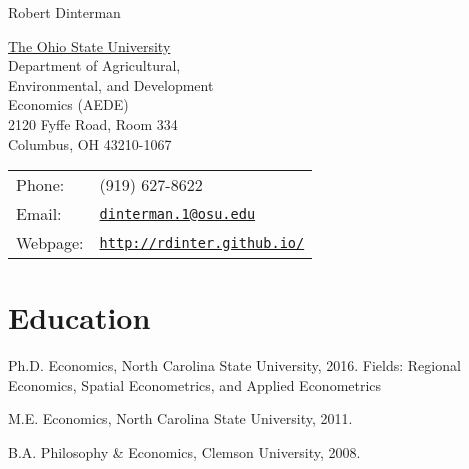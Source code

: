 \documentclass[letterpaper]{article}
\def\name{Robert Dinterman}
\renewenvironment{itemize}{
  \begin{list}{}{
    \setlength{\leftmargin}{1.5em}
  }
}{
  \end{list}
}
\begin{document}
{\huge \name}


\vspace{0.25in}

\begin{minipage}{0.45\linewidth}
  \href{http://aede.osu.edu/home}{The Ohio State University} \\
  Department of Agricultural, \\
  Environmental, and Development \\
  Economics (AEDE) \\
  2120 Fyffe Road, Room 334 \\
  Columbus, OH 43210-1067
\end{minipage}
\begin{minipage}{0.5\linewidth}
  \begin{tabular}{ll}
    Phone: & (919) 627-8622 \\
    Email: & \href{mailto:dinterman.1@osu.edu}{\tt dinterman.1@osu.edu} \\
    Webpage: & \href{http://rdinter.github.io/}{\tt http://rdinter.github.io/} \\
  \end{tabular}
\end{minipage}


% 
% 

\section*{Education}

\begin{itemize}
  \item Ph.D. Economics, North Carolina State University, 2016.
    \subitem Fields: Regional Economics, Spatial Econometrics, and Applied Econometrics

  \item M.E. Economics, North Carolina State University, 2011.

  \item B.A. Philosophy \& Economics, Clemson University, 2008.
\end{itemize}
\end{document}

